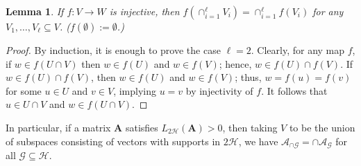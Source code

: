 \documentclass[journal, twocolumn]{IEEEtran}
\newtheorem{lemma}{Lemma}
\begin{document}


\begin{lemma}\label{spanIntersectionLemma}
If $f: V \to W$ is injective, then $f\left(\cap_{i=1}^\ell V_i \right) =  \cap_{i=1}^\ell f\left(V_i\right)$ for any $V_1, \ldots, V_\ell \subseteq V$. ($f(\emptyset):=\emptyset$.)
\end{lemma}
\begin{proof}
By induction, it is enough to prove the case $\ell = 2$. Clearly, for any map $f$, if $w \in f(U \cap V)$ then $w \in f(U)$ and $w \in f(V)$; hence, $w \in f(U) \cap f(V)$. If $w \in f(U) \cap f(V)$, then $w \in f(U)$ and $w \in f(V)$; thus, $w = f(u) = f(v)$ for some $u \in U$ and $v \in V$, implying $u = v$ by injectivity of $f$. It follows that $u \in U \cap V$ and $w \in f(U \cap V)$.
\end{proof}
In particular, if a matrix $\mathbf{A}$ satisfies $L_{2\mathcal{H}}(\mathbf{A}) > 0$, then taking $V$ to be the union of subspaces consisting of vectors with supports in $2\mathcal{H}$, we have $\bm{\mathcal{A}}_{\cap \mathcal{G}} = \cap \bm{\mathcal{A}}_\mathcal{G}$ for all $\mathcal{G} \subseteq \mathcal{H}$.
\end{document}
